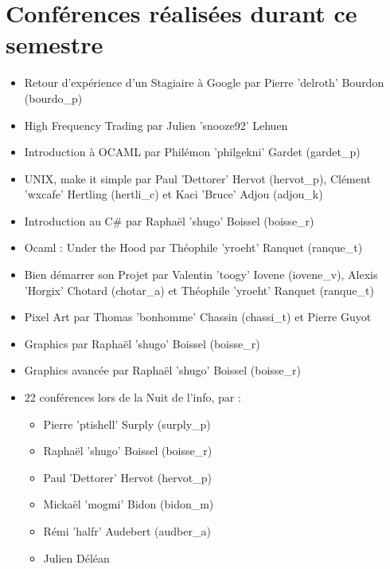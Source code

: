 \documentclass[12pt]{report}
\begin{document}
    \section{Conférences réalisées durant ce semestre}
    \begin{itemize}
            \item Retour d'expérience d'un Stagiaire à Google par Pierre
                    'delroth' Bourdon (bourdo\_p)
            \item High Frequency Trading par Julien 'snooze92' Lehuen
            \item Introduction à OCAML par Philémon 'philgekni' Gardet
                    (gardet\_p)
            \item UNIX, make it simple par Paul 'Dettorer' Hervot (hervot\_p),
                    Clément 'wxcafe' Hertling (hertli\_c) et Kaci 'Bruce' Adjou
                    (adjou\_k)
            \item Introduction au C\# par Raphaël 'shugo' Boissel (boisse\_r)
            \item Ocaml : Under the Hood par Théophile 'yroeht' Ranquet
                    (ranque\_t)
            \item Bien démarrer son Projet par Valentin 'toogy' Iovene
                    (iovene\_v), Alexis 'Horgix' Chotard (chotar\_a) et
                    Théophile 'yroeht' Ranquet (ranque\_t)
            \item Pixel Art par Thomas 'bonhomme' Chassin (chassi\_t) et Pierre Guyot
            \item Graphics par Raphaël 'shugo' Boissel (boisse\_r)
            \item Graphics avancée par Raphaël 'shugo' Boissel (boisse\_r)
            \item 22 conférences lors de la Nuit de l'info, par : \\
                    \begin{itemize}
                            \item Pierre 'ptishell' Surply (surply\_p)
                            \item Raphaël 'shugo' Boissel (boisse\_r)
                            \item Paul 'Dettorer' Hervot (hervot\_p)
                            \item Mickaël 'mogmi' Bidon (bidon\_m)
                            \item Rémi 'halfr' Audebert (audber\_a)
                            \item Julien Déléan

\end{itemize}
\end{itemize}
\end{document}
